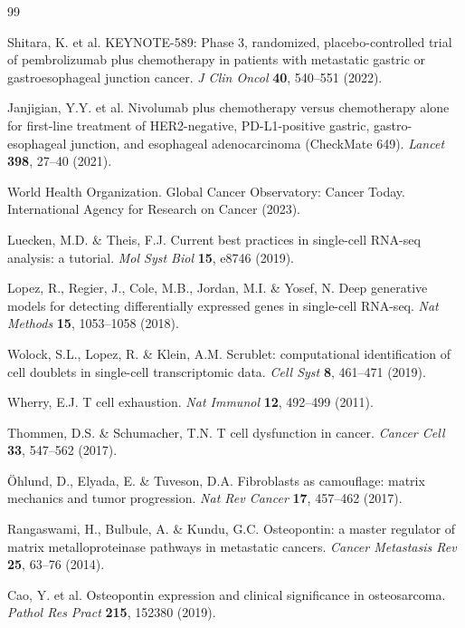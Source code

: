 \documentclass[12pt,twoside]{article}
\begin{document}
\begin{thebibliography}{99}

 Shitara, K. et al. KEYNOTE-589: Phase 3, randomized, placebo-controlled trial of pembrolizumab plus chemotherapy in patients with metastatic gastric or gastroesophageal junction cancer. \textit{J Clin Oncol} \textbf{40}, 540--551 (2022).

 Janjigian, Y.Y. et al. Nivolumab plus chemotherapy versus chemotherapy alone for first-line treatment of HER2-negative, PD-L1-positive gastric, gastro-esophageal junction, and esophageal adenocarcinoma (CheckMate 649). \textit{Lancet} \textbf{398}, 27--40 (2021).

 World Health Organization. Global Cancer Observatory: Cancer Today. International Agency for Research on Cancer (2023).

 Luecken, M.D. \& Theis, F.J. Current best practices in single-cell RNA-seq analysis: a tutorial. \textit{Mol Syst Biol} \textbf{15}, e8746 (2019).

 Lopez, R., Regier, J., Cole, M.B., Jordan, M.I. \& Yosef, N. Deep generative models for detecting differentially expressed genes in single-cell RNA-seq. \textit{Nat Methods} \textbf{15}, 1053--1058 (2018).

 Wolock, S.L., Lopez, R. \& Klein, A.M. Scrublet: computational identification of cell doublets in single-cell transcriptomic data. \textit{Cell Syst} \textbf{8}, 461--471 (2019).

 Wherry, E.J. T cell exhaustion. \textit{Nat Immunol} \textbf{12}, 492--499 (2011).

 Thommen, D.S. \& Schumacher, T.N. T cell dysfunction in cancer. \textit{Cancer Cell} \textbf{33}, 547--562 (2017).

 Öhlund, D., Elyada, E. \& Tuveson, D.A. Fibroblasts as camouflage: matrix mechanics and tumor progression. \textit{Nat Rev Cancer} \textbf{17}, 457--462 (2017).

 Rangaswami, H., Bulbule, A. \& Kundu, G.C. Osteopontin: a master regulator of matrix metalloproteinase pathways in metastatic cancers. \textit{Cancer Metastasis Rev} \textbf{25}, 63--76 (2014).

 Cao, Y. et al. Osteopontin expression and clinical significance in osteosarcoma. \textit{Pathol Res Pract} \textbf{215}, 152380 (2019).


\end{thebibliography}
\end{document}
